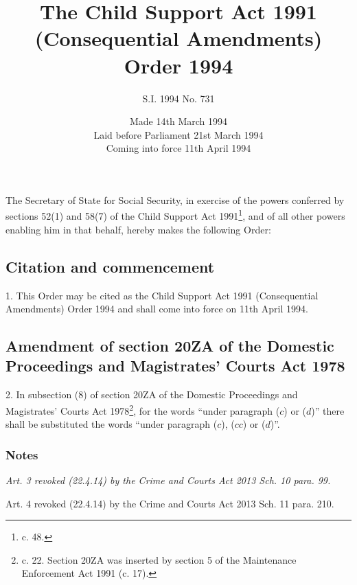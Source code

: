 \documentclass[a4paper]{article}
\title{The Child Support Act 1991 (Consequential Amendments) Order 1994}
\author{S.I. 1994 No. 731}
\date{Made 14th March 1994\\Laid before Parliament 21st March 1994\\Coming into force 11th April 1994}
\newcommand\amendment[1]{\subsubsection*{Notes}{\itshape\frenchspacing\footnotesize #1 \par}}
\begin{document}
\maketitle

\noindent
The Secretary of State for Social Security, in exercise of the powers conferred by sections 52(1) and 58(7) of the Child Support Act 1991\footnote{ c. 48.}, and of all other powers enabling him in that behalf, hereby makes the following Order:


{\sloppy

\tableofcontents

}

\setcounter{secnumdepth}{-2}

\subsection[1. Citation and commencement]{Citation and commencement}

1.  This Order may be cited as the Child Support Act 1991 (Consequential Amendments) Order 1994 and shall come into force on 11th April 1994.

\subsection[2. Amendment of section 20ZA of the Domestic Proceedings and Magistrates' Courts Act 1978]{Amendment of section 20ZA of the Domestic Proceedings and Magistrates' Courts Act 1978}

2.  In subsection (8) of section 20ZA of the Domestic Proceedings and Magistrates' Courts Act 1978\footnote{ c. 22. Section 20ZA was inserted by section 5 of the Maintenance Enforcement Act 1991 (c. 17).}, for the words “under paragraph ($c$) or ($d$)” there shall be substituted the words “under paragraph ($c$), ($cc$) or ($d$)”.

\amendment{
Art. 3 revoked (22.4.14) by the Crime and Courts Act 2013 Sch. 10 para. 99.

\medskip

Art. 4 revoked (22.4.14) by the Crime and Courts Act 2013 Sch. 11 para. 210.
}
\end{document}
